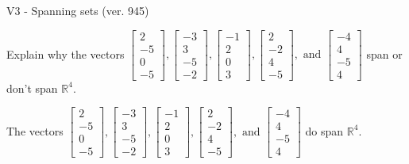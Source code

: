 \begin{exercise}
  \begin{exerciseTitle}V3 - Spanning sets (ver. 945)\end{exerciseTitle}
  \begin{exerciseStatement}
    Explain why the vectors \(\left[\begin{array}{r}
2 \\
-5 \\
0 \\
-5
\end{array}\right] , \left[\begin{array}{r}
-3 \\
3 \\
-5 \\
-2
\end{array}\right] , \left[\begin{array}{r}
-1 \\
2 \\
0 \\
3
\end{array}\right] , \left[\begin{array}{r}
2 \\
-2 \\
4 \\
-5
\end{array}\right] , \text{ and } \left[\begin{array}{r}
-4 \\
4 \\
-5 \\
4
\end{array}\right]\) span or don't span \(\mathbb{R}^4\). 
	


  \end{exerciseStatement}
  \begin{exerciseAnswer}
   The vectors \(\left[\begin{array}{r}
2 \\
-5 \\
0 \\
-5
\end{array}\right] , \left[\begin{array}{r}
-3 \\
3 \\
-5 \\
-2
\end{array}\right] , \left[\begin{array}{r}
-1 \\
2 \\
0 \\
3
\end{array}\right] , \left[\begin{array}{r}
2 \\
-2 \\
4 \\
-5
\end{array}\right] , \text{ and } \left[\begin{array}{r}
-4 \\
4 \\
-5 \\
4
\end{array}\right]\) 
  	 do  
	span \(\mathbb{R}^4\).
  



\end{exerciseAnswer}
\end{exercise}

